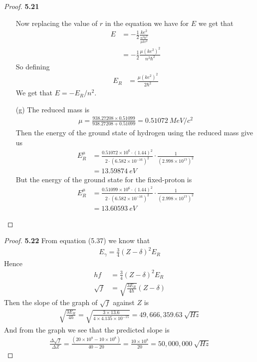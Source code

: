 \documentclass[11pt]{article}
\theoremstyle{definition}
\begin{document}
\begin{proof}{\textbf{5.21}}
\begin{itemize}
    Now replacing the value of $r$ in the equation we have for
    $E$ we get that
    \begin{align*}
        E &= -\frac{1}{2}\frac{ke^2}{\frac{n^2\hbar^2}{\mu ke^2}}\\
        &=-\frac{1}{2}\frac{\mu (ke^2)^2}{n^2\hbar^2}
    \end{align*}
    So defining 
    \begin{align*}
        E_R &=\frac{\mu (ke^2)^2}{2\hbar^2}
    \end{align*}
    We get that $E = -E_R/n^2$.
    \item [(g)]The reduced mass is 
    \begin{align*}
        \mu = \frac{938.27208 \times 0.51099}{938.27208 + 0.51099}
        = 0.51072~MeV/c^2
    \end{align*}
    Then the energy of the ground state of hydrogen using the reduced
    mass give us 
    \begin{align*}
       E_R^\mu &= \frac{0.51072\times 10^{6} \cdot (1.44)^2}
        {2 \cdot (6.582\times 10^{-16})^2}
        \cdot \frac{1}{(2.998 \times 10^{17})^2}\\
    &= 13.59874~eV
    \end{align*}
    But the energy of the ground state for the fixed-proton is
    \begin{align*}
        E_R^\mu &= \frac{0.51099\times 10^{6} \cdot (1.44)^2}
            {2 \cdot (6.582\times 10^{-16})^2}
            \cdot \frac{1}{(2.998 \times 10^{17})^2}\\
        &= 13.60593~eV
    \end{align*}
    
\end{itemize}
\end{proof}
\cleardoublepage
\begin{proof}{\textbf{5.22}}
    From equation (5.37) we know that
    \begin{align*}
        E_\gamma = \frac{3}{4}(Z - \delta)^2 E_R
    \end{align*}
    Hence
    \begin{align*}
        hf &= \frac{3}{4}(Z - \delta)^2 E_R\\
        \sqrt{f} &= \sqrt{\frac{3E_R}{4h}}(Z - \delta)
    \end{align*}
    Then the slope of the graph of $\sqrt f$ against $Z$ is
    \begin{align*}
        \sqrt{\frac{3E_R}{4h}}
        = \sqrt{\frac{3\times 13.6}{4 \times 4.135\times 10^{-15}}}
        = 49,666,359.63~\sqrt{Hz}
    \end{align*}
    And from the graph we see that the predicted slope is 
    \begin{align*}
        \frac{\Delta\sqrt{f}}{\Delta Z}
        = \frac{(20\times 10^8 - 10 \times 10^8)}{40 - 20   }
        = \frac{10\times 10^8}{20} = 50,000,000~\sqrt{Hz}
    \end{align*}
\end{proof}
\end{document}
